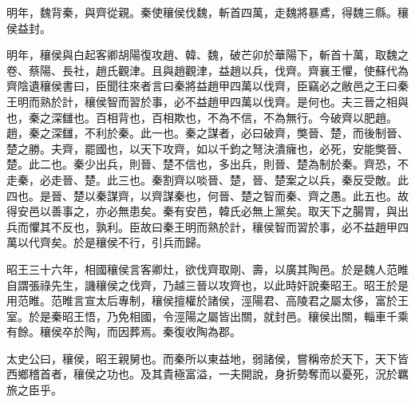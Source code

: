 明年，魏背秦，與齊從親。秦使穰侯伐魏，斬首四萬，走魏將暴鳶，得魏三縣。穰侯益封。

明年，穰侯與白起客卿胡陽復攻趙、韓、魏，破芒卯於華陽下，斬首十萬，取魏之卷、蔡陽、長社，趙氏觀津。且與趙觀津，益趙以兵，伐齊。齊襄王懼，使蘇代為齊陰遺穰侯書曰，臣聞往來者言曰秦將益趙甲四萬以伐齊，臣竊必之敝邑之王曰秦王明而熟於計，穰侯智而習於事，必不益趙甲四萬以伐齊。是何也。夫三晉之相與也，秦之深讎也。百相背也，百相欺也，不為不信，不為無行。今破齊以肥趙。趙，秦之深讎，不利於秦。此一也。秦之謀者，必曰破齊，獘晉、楚，而後制晉、楚之勝。夫齊，罷國也，以天下攻齊，如以千鈞之弩決潰癕也，必死，安能獘晉、楚。此二也。秦少出兵，則晉、楚不信也，多出兵，則晉、楚為制於秦。齊恐，不走秦，必走晉、楚。此三也。秦割齊以啖晉、楚，晉、楚案之以兵，秦反受敵。此四也。是晉、楚以秦謀齊，以齊謀秦也，何晉、楚之智而秦、齊之愚。此五也。故得安邑以善事之，亦必無患矣。秦有安邑，韓氏必無上黨矣。取天下之腸胃，與出兵而懼其不反也，孰利。臣故曰秦王明而熟於計，穰侯智而習於事，必不益趙甲四萬以代齊矣。於是穰侯不行，引兵而歸。

昭王三十六年，相國穰侯言客卿灶，欲伐齊取剛、壽，以廣其陶邑。於是魏人范睢自謂張祿先生，譏穰侯之伐齊，乃越三晉以攻齊也，以此時奸說秦昭王。昭王於是用范睢。范睢言宣太后專制，穰侯擅權於諸侯，涇陽君、高陵君之屬太侈，富於王室。於是秦昭王悟，乃免相國，令涇陽之屬皆出關，就封邑。穰侯出關，輜車千乘有餘。穰侯卒於陶，而因葬焉。秦復收陶為郡。

太史公曰，穰侯，昭王親舅也。而秦所以東益地，弱諸侯，嘗稱帝於天下，天下皆西鄉稽首者，穰侯之功也。及其貴極富溢，一夫開說，身折勢奪而以憂死，況於羈旅之臣乎。